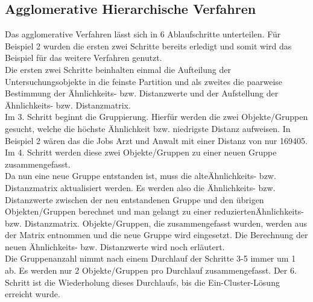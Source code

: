 \documentclass[12pt,titlepage]{article}
\begin{document}
		\subsection{Agglomerative Hierarchische Verfahren}
			Das agglomerative Verfahren lässt sich in 6 Ablaufschritte unterteilen. Für Beispiel 2 wurden die ersten zwei Schritte bereits erledigt und somit wird das Beispiel für das weitere Verfahren genutzt. \\
Die ersten zwei Schritte beinhalten einmal die Aufteilung der Untersuchungsobjekte in die feinste Partition und als zweites die paarweise Bestimmung der Ähnlichkeits- bzw. Distanzwerte und der Aufstellung der Ähnlichkeits- bzw. Distanzmatrix. \\
Im 3. Schritt beginnt die Gruppierung. Hierfür werden die zwei Objekte/Gruppen gesucht, welche die höchste Ähnlichkeit bzw. niedrigste Distanz aufweisen. In Beispiel 2 wären das die Jobs Arzt und Anwalt mit einer Distanz von nur 169405. Im 4. Schritt werden diese zwei Objekte/Gruppen zu einer neuen Gruppe zusammengefasst.\\
Da nun eine neue Gruppe entstanden ist, muss die \glqq alte\grqq  Ähnlichkeits- bzw. Distanzmatrix aktualisiert werden. Es werden also die Ähnlichkeits- bzw. Distanzwerte zwischen der neu entstandenen Gruppe und den übrigen Objekten/Gruppen berechnet und man gelangt zu einer \glqq reduzierten\grqq  Ähnlichkeits- bzw. Distanzmatrix. Objekte/Gruppen, die zusammengefasst wurden, werden aus der Matrix entnommen und die neue Gruppe wird eingesetzt. Die Berechnung der neuen Ähnlichkeits- bzw. Distanzwerte wird noch erläutert. \\
Die Gruppenanzahl nimmt nach einem Durchlauf der Schritte 3-5 immer um 1 ab. Es werden nur 2 Objekte/Gruppen pro Durchlauf zusammengefasst. Der 6. Schritt ist die Wiederholung dieses Durchlaufs, bis die Ein-Cluster-Lösung erreicht wurde. \\
\end{document}
